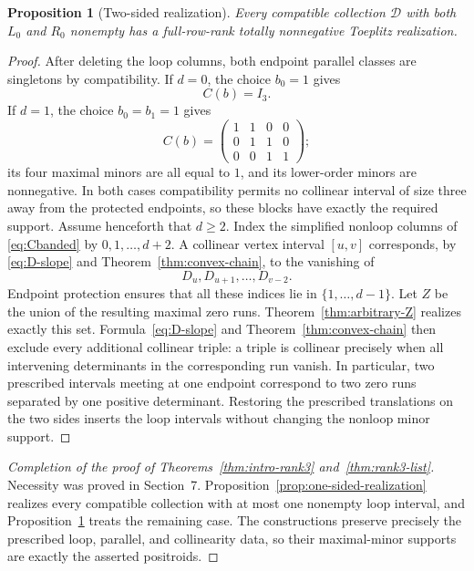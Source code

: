 \documentclass{amsart}
\numberwithin{equation}{section}
\newtheorem{proposition}[theorem]{Proposition}
\theoremstyle{definition}
\theoremstyle{remark}
\begin{document}
\begin{proposition}[Two-sided realization]\label{prop:two-sided-realization}
Every compatible collection $\mathcal D$ with both $L_0$ and $R_0$ nonempty has a full-row-rank totally nonnegative Toeplitz realization.
\end{proposition}

\begin{proof}
After deleting the loop columns, both endpoint parallel classes are singletons by compatibility.  If $d=0$, the choice $b_0=1$ gives
\[
 C(b)=I_3.
\]
If $d=1$, the choice $b_0=b_1=1$ gives
\[
 C(b)=
 \begin{pmatrix}
 1&1&0&0\\
 0&1&1&0\\
 0&0&1&1
 \end{pmatrix};
\]
its four maximal minors are all equal to $1$, and its lower-order minors are nonnegative.  In both cases compatibility permits no collinear interval of size three away from the protected endpoints, so these blocks have exactly the required support.  Assume henceforth that $d\ge2$.  Index the simplified nonloop columns of \eqref{eq:Cbanded} by $0,1,\ldots,d+2$.  A collinear vertex interval $[u,v]$ corresponds, by \eqref{eq:D-slope} and Theorem~\ref{thm:convex-chain}, to the vanishing of
\[
 D_u,D_{u+1},\ldots,D_{v-2}.
\]
Endpoint protection ensures that all these indices lie in $\{1,\ldots,d-1\}$.  Let $Z$ be the union of the resulting maximal zero runs.  Theorem~\ref{thm:arbitrary-Z} realizes exactly this set.  Formula~\eqref{eq:D-slope} and Theorem~\ref{thm:convex-chain} then exclude every additional collinear triple: a triple is collinear precisely when all intervening determinants in the corresponding run vanish.  In particular, two prescribed intervals meeting at one endpoint correspond to two zero runs separated by one positive determinant.  Restoring the prescribed translations on the two sides inserts the loop intervals without changing the nonloop minor support.
\end{proof}

\begin{proof}[Completion of the proof of Theorems~\ref{thm:intro-rank3} and~\ref{thm:rank3-list}]
Necessity was proved in Section~7.  Proposition~\ref{prop:one-sided-realization} realizes every compatible collection with at most one nonempty loop interval, and Proposition~\ref{prop:two-sided-realization} treats the remaining case.  The constructions preserve precisely the prescribed loop, parallel, and collinearity data, so their maximal-minor supports are exactly the asserted positroids.
\end{proof}
\end{document}
